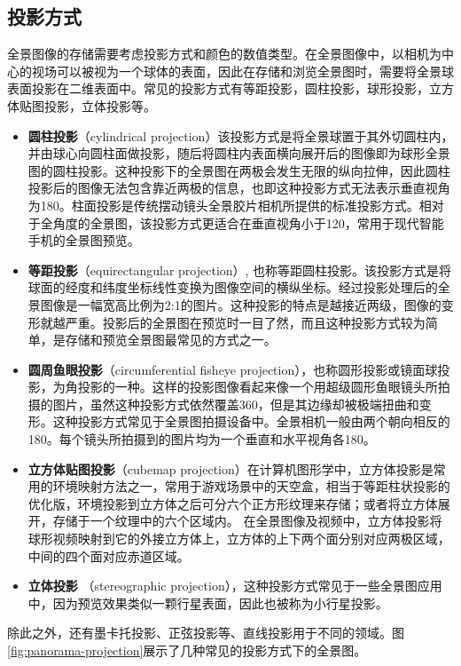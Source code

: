 \subsection{投影方式}

全景图像的存储需要考虑投影方式和颜色的数值类型。在全景图像中，以相机为中心的视场可以被视为一个球体的表面，因此在存储和浏览全景图时，需要将全景球表面投影在二维表面中。常见的投影方式有等距投影，圆柱投影，球形投影，立方体贴图投影，立体投影等。
\begin{itemize}
\item \textbf{圆柱投影}（cylindrical projection）该投影方式是将全景球置于其外切圆柱内，并由球心向圆柱面做投影，随后将圆柱内表面横向展开后的图像即为球形全景图的圆柱投影。这种投影下的全景图在两极会发生无限的纵向拉伸，因此圆柱投影后的图像无法包含靠近两极的信息，也即这种投影方式无法表示垂直视角为180。柱面投影是传统摆动镜头全景胶片相机所提供的标准投影方式。相对于全角度的全景图，该投影方式更适合在垂直视角小于120，常用于现代智能手机的全景图预览。
\item \textbf{等距投影}（equirectangular projection）, 也称等距圆柱投影。该投影方式是将球面的经度和纬度坐标线性变换为图像空间的横纵坐标。经过投影处理后的全景图像是一幅宽高比例为2:1的图片。这种投影的特点是越接近两级，图像的变形就越严重。投影后的全景图在预览时一目了然，而且这种投影方式较为简单，是存储和预览全景图最常见的方式之一。
\item \textbf{圆周鱼眼投影}（circumferential fisheye projection），也称圆形投影或镜面球投影，为角投影的一种。这样的投影图像看起来像一个用超级圆形鱼眼镜头所拍摄的图片，虽然这种投影方式依然覆盖360，但是其边缘却被极端扭曲和变形。这种投影方式常见于全景图拍摄设备中。全景相机一般由两个朝向相反的180。每个镜头所拍摄到的图片均为一个垂直和水平视角各180。
\item \textbf{立方体贴图投影}（cubemap projection）在计算机图形学中，立方体投影是常用的环境映射方法之一，常用于游戏场景中的天空盒，相当于等距柱状投影的优化版，环境投影到立方体之后可分六个正方形纹理来存储；或者将立方体展开，存储于一个纹理中的六个区域内。 
在全景图像及视频中，立方体投影将球形视频映射到它的外接立方体上，立方体的上下两个面分别对应两极区域，中间的四个面对应赤道区域。
\item \textbf{立体投影} （stereographic projection），这种投影方式常见于一些全景图应用中，因为预览效果类似一颗行星表面，因此也被称为小行星投影。
\end{itemize}
除此之外，还有墨卡托投影、正弦投影等、直线投影用于不同的领域。图\ref{fig:panorama-projection}展示了几种常见的投影方式下的全景图。

